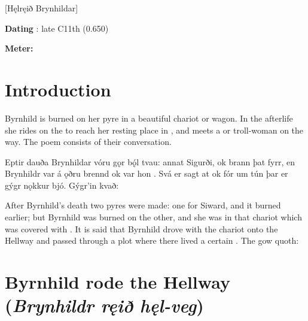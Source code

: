 [Hęlręið Brynhildar]
\def\thisBookCode{Helreid}

\begin{flushright}%
\textbf{Dating} \parencite{Sapp2022}: late C11th (0.650)

\textbf{Meter:} \Fornyrdislag
\end{flushright}%

\section{Introduction}

{\small Byrnhild is burned on her pyre in a beautiful chariot or wagon.  In the afterlife she rides on the  to reach her resting place in , and meets a  or troll-woman on the way.  The poem consists of their conversation.}

\sectionline

\bpg\bpa Eptir dauða Brynhildar vóru gǫr bǫ́l tvau: annat Sigurði, ok brann þat fyrr, en Brynhildr var á ǫðru brennd ok var hon .  Svá er sagt at  ok fór um tún þar er gýgr nǫkkur bjó.  Gýgr’in kvað:\epa

\bpb After Byrnhild’s death two pyres were made: one for Siward, and it burned earlier; but Byrnhild was burned on the other, and she was in that chariot which was covered with .  It is said that Byrnhild drove with the chariot onto the Hellway and passed through a plot where there lived a certain . The gow quoth:\epb\epg

\section{Byrnhild rode the Hellway (\emph{Brynhildr ręið hęl-veg})}

